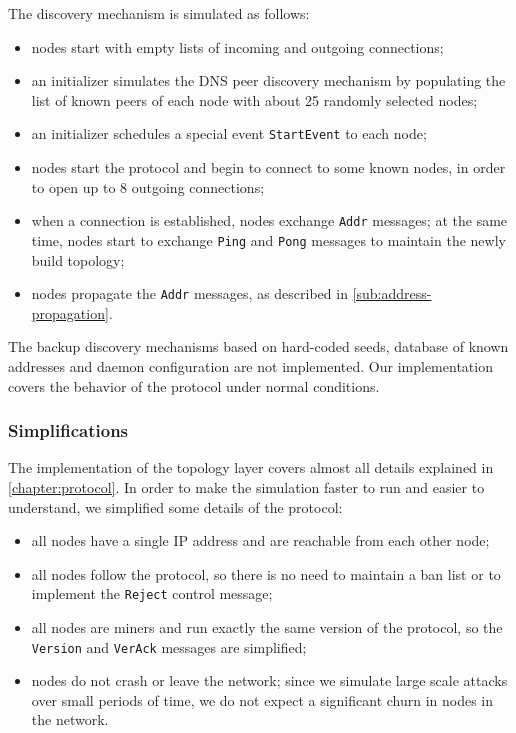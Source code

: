 \medskip
\noindent
The discovery mechanism is simulated as follows:
\begin{itemize}
	\item nodes start with empty lists of incoming and outgoing connections;
	\item an initializer simulates the DNS peer discovery mechanism by populating the list of known peers of each node with about \num{25} randomly selected nodes;
	\item an initializer schedules a special event \texttt{StartEvent} to each node;
	\item nodes start the protocol and begin to connect to some known nodes, in order to open up to \num{8} outgoing connections;
	\item when a connection is established, nodes exchange \texttt{Addr} messages; at the same time, nodes start to exchange \texttt{Ping} and \texttt{Pong} messages to maintain the newly build topology;
	\item nodes propagate the \texttt{Addr} messages, as described in \cref{sub:address-propagation}.
\end{itemize}
The backup discovery mechanisms based on hard-coded seeds, database of known addresses and daemon configuration are not implemented.
Our implementation covers the behavior of the protocol under normal conditions.

\subsubsection{Simplifications}
The implementation of the topology layer covers almost all details explained in \cref{chapter:protocol}.
In order to make the simulation faster to run and easier to understand, we simplified some details of the protocol:
\begin{itemize}
	\item all nodes have a single IP address and are reachable from each other node;
	\item all nodes follow the protocol, so there is no need to maintain a ban list or to implement the \texttt{Reject} control message;
	\item all nodes are miners and run exactly the same version of the protocol, so the \texttt{Version} and \texttt{VerAck} messages are simplified;
	\item nodes do not crash or leave the network; since we simulate large scale attacks over small periods of time, we do not expect a significant churn in nodes in the network.
\end{itemize}

